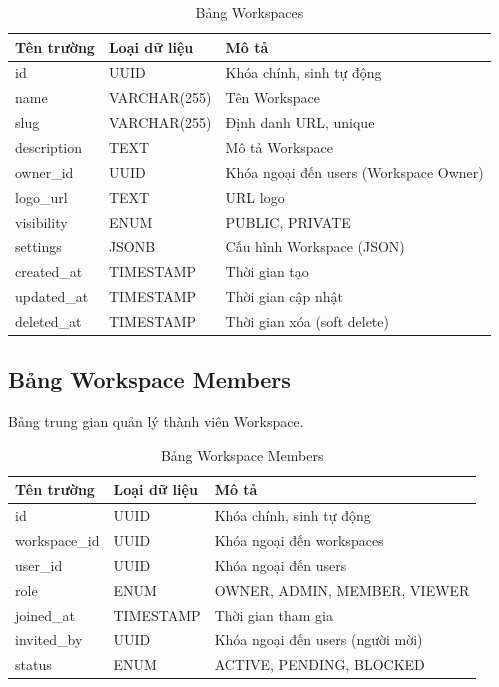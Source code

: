 \documentclass[12pt,a4paper]{report}
\begin{document}
\begin{table}[H]
\centering
\caption{Bảng Workspaces}
\begin{tabular}{|p{4cm}|p{4cm}|p{7cm}|}
\hline
\textbf{Tên trường} & \textbf{Loại dữ liệu} & \textbf{Mô tả} \\
\hline
id & UUID & Khóa chính, sinh tự động \\
\hline
name & VARCHAR(255) & Tên Workspace \\
\hline
slug & VARCHAR(255) & Định danh URL, unique \\
\hline
description & TEXT & Mô tả Workspace \\
\hline
owner\_id & UUID & Khóa ngoại đến users (Workspace Owner) \\
\hline
logo\_url & TEXT & URL logo \\
\hline
visibility & ENUM & PUBLIC, PRIVATE \\
\hline
settings & JSONB & Cấu hình Workspace (JSON) \\
\hline
created\_at & TIMESTAMP & Thời gian tạo \\
\hline
updated\_at & TIMESTAMP & Thời gian cập nhật \\
\hline
deleted\_at & TIMESTAMP & Thời gian xóa (soft delete) \\
\hline
\end{tabular}
\label{tab:workspaces_table}
\end{table}


\subsection{Bảng Workspace Members}

Bảng trung gian quản lý thành viên Workspace.

\begin{table}[H]
\centering
\caption{Bảng Workspace Members}
\begin{tabular}{|p{4cm}|p{4cm}|p{7cm}|}
\hline
\textbf{Tên trường} & \textbf{Loại dữ liệu} & \textbf{Mô tả} \\
\hline
id & UUID & Khóa chính, sinh tự động \\
\hline
workspace\_id & UUID & Khóa ngoại đến workspaces \\
\hline
user\_id & UUID & Khóa ngoại đến users \\
\hline
role & ENUM & OWNER, ADMIN, MEMBER, VIEWER \\
\hline
joined\_at & TIMESTAMP & Thời gian tham gia \\
\hline
invited\_by & UUID & Khóa ngoại đến users (người mời) \\
\hline
status & ENUM & ACTIVE, PENDING, BLOCKED \\
\hline
\end{tabular}
\label{tab:workspace_members_table}
\end{table}
\end{document}
